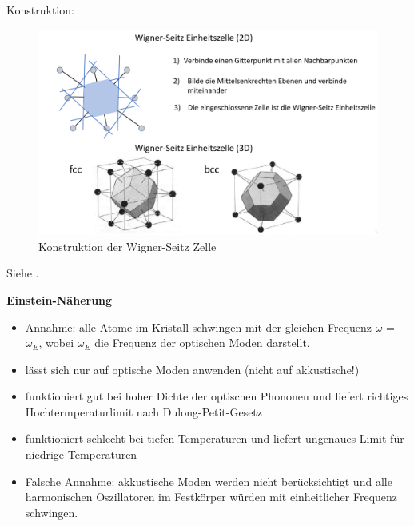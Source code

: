 Konstruktion:
\begin{figure}[H]
    \centering
    \includegraphics[width=0.8\linewidth]{resources/15-06-2015/q33.png}
    \caption{Konstruktion der Wigner-Seitz Zelle}
\end{figure}

\label{q:34}

\label{q:35}

\label{q:36}

\label{q:37}

\label{q:38}

Siehe .

\label{q:39}

\label{q:40}
\textbf{Einstein-Näherung} 
\begin{itemize}
    \item Annahme: alle Atome im Kristall schwingen mit der gleichen Frequenz $\omega$ = $\omega_E$, wobei $\omega_E$ die Frequenz der optischen Moden darstellt. 
    \item lässt sich nur auf optische Moden anwenden (nicht auf akkustische!)
    \item funktioniert gut bei hoher Dichte der optischen Phononen und liefert richtiges 
    Hochtermperaturlimit nach Dulong-Petit-Gesetz
    \item funktioniert schlecht bei tiefen Temperaturen und liefert ungenaues Limit für niedrige Temperaturen
    \item Falsche Annahme: akkustische Moden werden nicht berücksichtigt und alle harmonischen Oszillatoren im Festkörper würden mit einheitlicher Frequenz schwingen.
\end{itemize}


